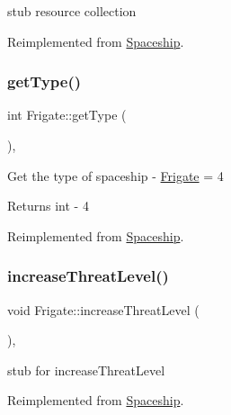 stub resource collection 

Reimplemented from \hyperlink{classSpaceship_ad2027533de1d789db5e3efa22055f2d0}{Spaceship}.

\mbox{\label{classFrigate_a9716770249d0a26a114a69e5e3794bd9}} 
\subsubsection{\texorpdfstring{get\+Type()}{getType()}}
{\footnotesize\ttfamily int Frigate\+::get\+Type (\begin{DoxyParamCaption}{ }\end{DoxyParamCaption})\hspace{0.3cm}{\ttfamily [inline]}, {\ttfamily [virtual]}}

Get the type of spaceship -\/ \hyperlink{classFrigate}{Frigate} = 4 \begin{DoxyReturn}{Returns}
int -\/ 4 
\end{DoxyReturn}


Reimplemented from \hyperlink{classSpaceship_a113055e6d793f8fbc55e44efc4d57e07}{Spaceship}.

\mbox{\label{classFrigate_ab4dd2319ec0a045e613c85b2c599a3e2}} 
\subsubsection{\texorpdfstring{increase\+Threat\+Level()}{increaseThreatLevel()}}
{\footnotesize\ttfamily void Frigate\+::increase\+Threat\+Level (\begin{DoxyParamCaption}{ }\end{DoxyParamCaption})\hspace{0.3cm}{\ttfamily [inline]}, {\ttfamily [virtual]}}

stub for increase\+Threat\+Level 

Reimplemented from \hyperlink{classSpaceship_a5ddf702124286d9d3a6b5e64c09515bc}{Spaceship}.

\mbox{\label{classFrigate_a97f2fd73f269ee81e6f8185110769cc5}} 
